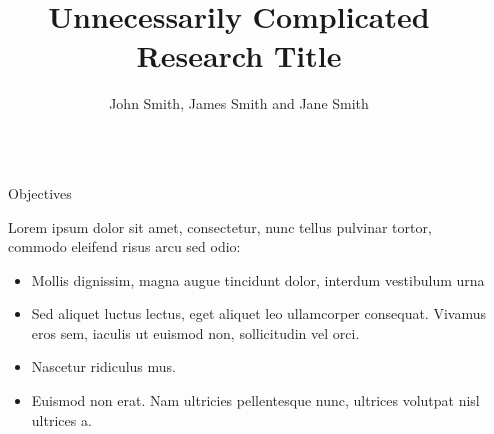 \documentclass[final]{beamer}
\title{Unnecessarily Complicated Research Title} %
\author{John Smith\inst{1}, James Smith\inst{2} and Jane Smith\inst{3}} %
\institute{McGill University} %
\newlength{\sepwid}
\newlength{\onecolwid}
\begin{document}

\setlength{\belowcaptionskip}{2ex} %
\setlength\belowdisplayshortskip{2ex} %

\begin{frame}[t] %

\begin{columns}[t] %

\begin{column}{\sepwid}\end{column} %

\begin{column}{\onecolwid} %


\begin{alertblock}{Objectives}

Lorem ipsum dolor sit amet, consectetur, nunc tellus pulvinar tortor, commodo eleifend risus arcu sed odio:
\begin{itemize}
\item Mollis dignissim, magna augue tincidunt dolor, interdum vestibulum urna
\item Sed aliquet luctus lectus, eget aliquet leo ullamcorper consequat. Vivamus eros sem, iaculis ut euismod non, sollicitudin vel orci.
\item Nascetur ridiculus mus.  
\item Euismod non erat. Nam ultricies pellentesque nunc, ultrices volutpat nisl ultrices a.
\end{itemize}

\end{alertblock}



\end{column}
\end{columns}
\end{frame}
\end{document}
